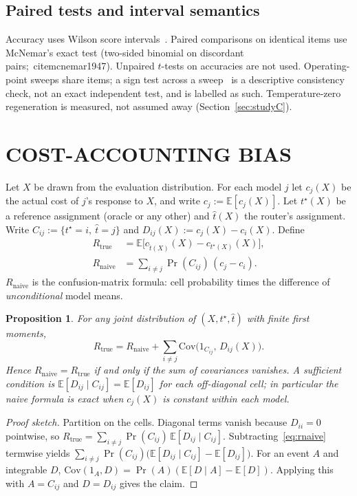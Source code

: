 \documentclass[a4paper,twoside]{article}
\newtheorem{proposition}{Proposition}
\begin{document}
\subsection{Paired tests and interval semantics}

Accuracy uses Wilson score intervals~\cite{wilson1927,newcombe1998}. Paired comparisons on identical items use McNemar's exact test (two-sided binomial on discordant pairs;~cite{mcnemar1947}). Unpaired $t$-tests on accuracies are not used. Operating-point sweeps share items; a sign test across a sweep~\cite{conover1980sign} is a descriptive consistency check, not an exact independent test, and is labelled as such. Temperature-zero regeneration is measured, not assumed away (Section~\ref{sec:studyC}).

\section{\uppercase{Cost-Accounting Bias}}
\label{sec:accounting}

Let $X$ be drawn from the evaluation distribution. For each model $j$ let $c_j(X)$ be the actual cost of $j$'s response to $X$, and write $c_j := \mathbb{E}[c_j(X)]$. Let $t^\star(X)$ be a reference assignment (oracle or any other) and $\hat t(X)$ the router's assignment. Write $C_{ij} := \{t^\star = i,\ \hat t = j\}$ and $D_{ij}(X) := c_j(X) - c_i(X)$. Define
\begin{align}
R_{\mathrm{true}} &= \mathbb{E}\bigl[c_{\hat t(X)}(X) - c_{t^\star(X)}(X)\bigr], \label{eq:rtrue}\\
R_{\mathrm{naive}} &= \sum_{i \neq j} \Pr(C_{ij})\,(c_j - c_i). \label{eq:rnaive}
\end{align}
$R_{\mathrm{naive}}$ is the confusion-matrix formula: cell probability times the difference of \emph{unconditional} model means.

\begin{proposition}
\label{prop:identity}
For any joint distribution of $(X,t^\star,\hat t)$ with finite first moments,
\[
R_{\mathrm{true}} = R_{\mathrm{naive}} + \sum_{i\neq j} \mathrm{Cov}\bigl(1_{C_{ij}},\, D_{ij}(X)\bigr).
\]
Hence $R_{\mathrm{naive}}=R_{\mathrm{true}}$ if and only if the sum of covariances vanishes. A sufficient condition is $\mathbb{E}[D_{ij}\mid C_{ij}]=\mathbb{E}[D_{ij}]$ for each off-diagonal cell; in particular the naive formula is exact when $c_j(X)$ is constant within each model.
\end{proposition}

\begin{proof}[Proof sketch]
Partition on the cells. Diagonal terms vanish because $D_{ii}=0$ pointwise, so
$R_{\mathrm{true}} = \sum_{i\neq j}\Pr(C_{ij})\,\mathbb{E}[D_{ij}\mid C_{ij}]$.
Subtracting~\eqref{eq:rnaive} termwise yields
$\sum_{i\neq j}\Pr(C_{ij})\bigl(\mathbb{E}[D_{ij}\mid C_{ij}]-\mathbb{E}[D_{ij}]\bigr)$.
For an event $A$ and integrable $D$, $\mathrm{Cov}(1_A,D)=\Pr(A)(\mathbb{E}[D\mid A]-\mathbb{E}[D])$. Applying this with $A=C_{ij}$ and $D=D_{ij}$ gives the claim.
\end{proof}
\end{document}
